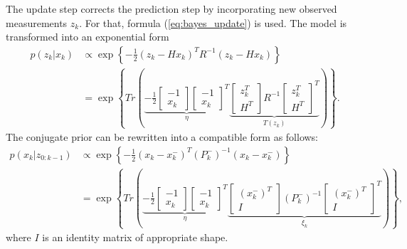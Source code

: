 The update step corrects the prediction step by incorporating new observed measurements $z_k$. For that, formula (\ref{eq:bayes_update}) is used. The model is transformed into an exponential form
\begin{align}
    p(z_k|x_k) &\propto \exp \left\{-\frac{1}{2}(z_k - Hx_k)^T R^{-1} (z_k - Hx_k)\right \} \nonumber \\
    &= \exp
    \left\{
        Tr\left(
        \underbrace{
            -\frac{1}{2}
            \begin{bmatrix}
                -1 \\
                x_k
            \end{bmatrix}
            \begin{bmatrix}
                -1 \\
                x_k
            \end{bmatrix}^T
        }_{\eta}
        \underbrace{
            \begin{bmatrix}
                z_k^T \\
                H^T
            \end{bmatrix}
            R^{-1}
            \begin{bmatrix}
                z_k^T \\
                H^T
            \end{bmatrix}^T
        }_{T(z_k)}
        \right)
    \right\}.
\end{align}
The conjugate prior can be rewritten into a compatible form as follows:
\begin{align}
    p(x_k|z_{0:k-1}) &\propto \exp
    \left\{-\frac{1}{2}(x_k - x_k^-)^T (P_k^-)^{-1} (x_k - x_k^-)\right \} \nonumber \\
    &= \exp
    \left\{
    Tr\left(
    \underbrace{
        -\frac{1}{2}
        \begin{bmatrix}
            -1 \\
            x_k
        \end{bmatrix}
        \begin{bmatrix}
            -1 \\
            x_k
        \end{bmatrix}^T
    }_{\eta}
    \underbrace{
        \begin{bmatrix}
            (x_k^-)^T \\
            I
        \end{bmatrix}
        (P_k^-)^{-1}
        \begin{bmatrix}
            (x_k^-)^T \\
            I
        \end{bmatrix}^T
    }_{\xi_k}
    \right)
    \right\},
\end{align}
where $I$ is an identity matrix of appropriate shape.

